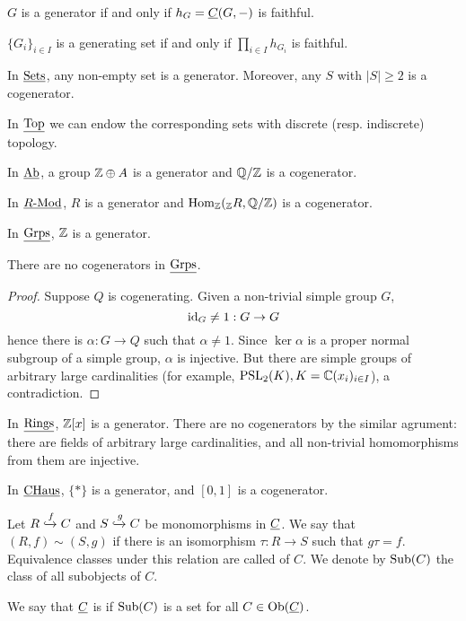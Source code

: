 \begin{remarks*}
	\item \( G \) is a generator if and only if \( h_G = \underline{C}(G, -) \) is faithful.
	\item \( \{G_i\}_{i \in I} \) is a generating set if and only if \( \prod_{i \in I} h_{G_i} \) is faithful.
\end{remarks*}

\begin{examples*}
	\item In \( \underline{\mathrm{Sets}} \), any non-empty set is a generator. Moreover, any \( S \) with \( |S| \ge 2 \) is a cogenerator.
	\item In \( \underline{\mathrm{Top}} \) we can endow the corresponding sets with discrete (resp. indiscrete) topology.
	\item In \( \underline{\mathrm{Ab}} \), a group \( \mathbb{Z} \oplus A \) is a generator and \( \mathbb{Q}/\mathbb{Z} \) is a cogenerator.
	\item In \( \underline{R\text{-}\mathrm{Mod}} \), \( R \) is a generator and \( \operatorname{Hom}_\mathbb{Z}(_\mathbb{Z} R, \mathbb{Q}/\mathbb{Z}) \) is a cogenerator.
	\item In \( \underline{\mathrm{Grps}} \), \( \mathbb{Z} \) is a generator.
		\begin{statement*}
			There are no cogenerators in \( \underline{\mathrm{Grps}} \).
		\end{statement*}
		\begin{proof}
			Suppose \( Q \) is cogenerating. Given a non-trivial simple group \( G \),
			\[
				\mathrm{id}_G \neq 1: G \to G
			\]
			hence there is \( \alpha: G \to Q \) such that \( \alpha \neq 1 \). Since \( \ker \alpha \) is a proper normal subgroup of a simple group, \( \alpha \) is injective. But there are simple groups of arbitrary large cardinalities (for example, \( \mathrm{PSL}_2(K), K = \mathbb{C}(x_i)_{i \in I} \)), a contradiction.
		\end{proof}
	\item In \( \underline{\mathrm{Rings}} \), \( \mathbb{Z}[x] \) is a generator. There are no cogenerators by the similar agrument: there are fields of arbitrary large cardinalities, and all non-trivial homomorphisms from them are injective.
	\item In \( \underline{\mathrm{CHaus}} \), \( \{\ast\} \) is a generator, and \( [0, 1] \) is a cogenerator.
\end{examples*}

\begin{definitions*}
	\item Let \( R \xhookrightarrow{f} C \) and \( S \xhookrightarrow{g} C \) be monomorphisms in \( \underline{C} \). We say that \( (R, f) \sim (S, g) \) if there is an isomorphism \( \tau: R \to S \) such that \( g \tau = f \). Equivalence classes under this relation are called  of \( C \). We denote by \( \operatorname{Sub}(C) \) the class of all subobjects of \( C \).
	\item We say that \( \underline{C} \) is  if \( \operatorname{Sub}(C) \) is a set for all \( C \in \operatorname{Ob}(\underline{C}) \).
\end{definitions*}

